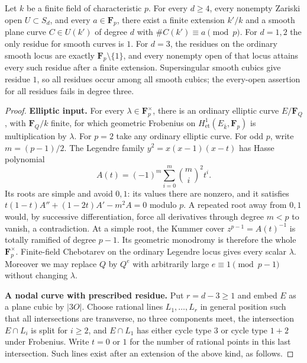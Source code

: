 \begin{theorem}\label{thm:plane-all-residues}
Let $k$ be a finite field of characteristic $p$.  For every $d\geq4$,
every nonempty Zariski open $U\subset S_d$, and every $a\in\mathbf F_p$,
there exist a finite extension $k'/k$ and a smooth plane curve
$C\in U(k')$ of degree $d$ with $\#C(k')\equiv a\pmod p$.
For $d=1,2$ the only residue for smooth curves is $1$.
For $d=3$, the residues on the ordinary smooth locus are exactly
$\mathbf F_p\setminus\{1\}$, and every nonempty open of that locus
attains every such residue after a finite extension.  Supersingular
smooth cubics give residue $1$, so all residues occur among all smooth
cubics; the every-open assertion for all residues fails in degree three.
\end{theorem}
\begin{proof}

\par\smallskip\noindent\textbf{Elliptic input.}
For every $\lambda\in\mathbf F_p^\times$, there is an ordinary elliptic
curve $E/\mathbf F_Q$, with $\mathbf F_Q/k$ finite, for which geometric
Frobenius on $H^1_{\mathrm{et}}(E_{\bar k},\mathbf F_p)$ is multiplication
by $\lambda$.  For $p=2$ take any ordinary elliptic curve.  For odd $p$,
write $m=(p-1)/2$.  The Legendre family
$y^2=x(x-1)(x-t)$ has Hasse polynomial
\[
 A(t)=(-1)^m\sum_{i=0}^{m}\binom mi^2t^i.
\]
Its roots are simple and avoid $0,1$: its values there are nonzero,
and it satisfies
$t(1-t)A''+(1-2t)A'-m^2A=0$ modulo $p$.
A repeated root away from $0,1$ would, by successive differentiation,
force all derivatives through degree $m<p$ to vanish, a contradiction.
At a simple root, the Kummer cover $z^{p-1}=A(t)^{-1}$ is totally
ramified of degree $p-1$.  Its geometric monodromy is therefore the
whole $\mathbf F_p^\times$.  Finite-field Chebotarev on the ordinary
Legendre locus gives every scalar $\lambda$.
Moreover we may replace $Q$ by $Q^e$ with arbitrarily large
$e\equiv1\pmod{p-1}$ without changing $\lambda$.

\par\smallskip\noindent\textbf{A nodal curve with prescribed residue.}
Put $r=d-3\geq1$ and embed $E$ as a plane cubic by $|3O|$.
Choose rational lines $L_1,\ldots,L_r$ in general position such that
all intersections are transverse, no three components meet, the
intersection $E\cap L_i$ is split for $i\geq2$, and
$E\cap L_1$ has either cycle type $3$ or cycle type $1+2$ under
Frobenius.  Write $t=0$ or $1$ for the number of rational points in
this last intersection.  Such lines exist after an extension of the
above kind, as follows.


\end{proof}

